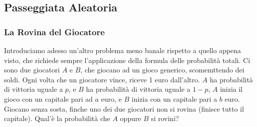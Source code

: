 \documentclass[12pt, letterpaper]{article}
\begin{document}
\subsection{Passeggiata Aleatoria}
\subsubsection{La Rovina del Giocatore}
Introduciamo adesso un'altro problema meno banale rispetto a quello appena visto, che richiede sempre l'applicazione 
della formula delle probabilità totali. Ci sono due giocatori \(A\) e \(B\), che giocano ad un gioco generico, scomemttendo dei soldi. 
Ogni volta che un giocatore vince, riceve 1 euro dall'altro. \(A\) ha probabilità di vittoria uguale a \(p\), 
e \(B\) ha probabilità di vittoria uguale a \(1-p\), \(A\) inizia il gioco con un capitale pari ad \(a\) euro, 
e \(B\) inizia con un capitale pari a \(b\) euro. Giocano senza sosta, finche uno dei due giocatori 
non si rovina (finisce tutto il capitale). Qual'è la probabilità che \(A\) oppure \(B\) si rovini?
\end{document}
